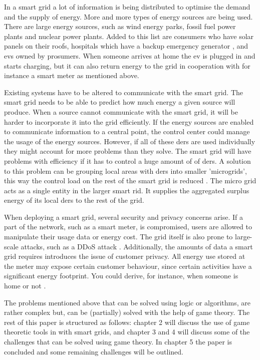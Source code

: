 In a smart grid a lot of information is being distributed to optimise the demand and the supply of energy. More and more types of energy sources are being used. There are large energy sources, such as wind energy parks, fossil fuel power plants and nuclear power plants. Added to this list are consumers who have solar panels on their roofs, hospitals which have a backup emergency generator \cite{Kumagai2012}, and \acp{ev} owned by prosumers. When someone arrives at home the \ac{ev} is plugged in and starts charging, but it can also return energy to the grid in cooperation with for instance a smart meter as mentioned above.

Existing systems have to be altered to communicate with the smart grid. The smart grid needs to be able to predict how much energy a given source will produce. When a source cannot communicate with the smart grid, it will be harder to incorporate it into the grid efficiently. If the energy sources are enabled to communicate information to a central point, the control center could manage the usage of the energy sources. However, if all of these \acp{der} are used individually they might account for more problems than they solve. The smart grid will have problems with efficiency if it has to control a huge amount of of \acp{der}. A solution to this problem can be grouping local areas with \acp{der} into smaller 'microgrids', this way the control load on the rest of the smart grid is reduced \cite{HatziargyriouAsanoIravaniMarnay2007}. The micro grid acts as a single entity in the larger smart rid. It supplies the aggregated surplus energy of its local \acp{der} to the rest of the grid. 

When deploying a smart grid, several security and privacy concerns arise.  If a part of the network, such as a smart meter, is compromised, users are allowed to manipulate their usage data or energy cost. The grid itself is also prone to large-scale attacks, such as a DDoS attack \cite{McDanielMcLaughlin2009a}. Additionally, the amounts of data a smart grid requires introduces the issue of customer privacy. All energy use stored at the meter may expose certain customer behaviour, since certain activities have a significant energy footprint. You could derive, for instance, when someone is home or not \cite{Molina-MarkhamShenoyFuEtAl2010}.

The problems mentioned above that can be solved using logic or algorithms, are rather complex but, can be (partially) solved with the help of game theory. The rest of this paper is structured as follows: chapter 2 will discuss the use of game theoretic tools in with smart grids, and chapter 3 and 4 will discuss some of the challenges that can be solved using game theory. In chapter 5 the paper is concluded and some remaining challenges will be outlined.
